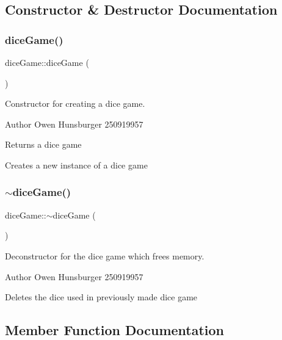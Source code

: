 \subsection{Constructor \& Destructor Documentation}
\mbox{\label{classdiceGame_ae964394c63494b6ceb6403e7a66aa4b2}} 
\subsubsection{\texorpdfstring{dice\+Game()}{diceGame()}}
{\footnotesize\ttfamily dice\+Game\+::dice\+Game (\begin{DoxyParamCaption}{ }\end{DoxyParamCaption})}



Constructor for creating a dice game. 

\begin{DoxyAuthor}{Author}
Owen Hunsburger 250919957 
\end{DoxyAuthor}
\begin{DoxyReturn}{Returns}
a dice game
\end{DoxyReturn}
Creates a new instance of a dice game \mbox{\label{classdiceGame_a33c18d6e62bb7599befc405ecbb21402}} 
\subsubsection{\texorpdfstring{$\sim$dice\+Game()}{~diceGame()}}
{\footnotesize\ttfamily dice\+Game\+::$\sim$dice\+Game (\begin{DoxyParamCaption}{ }\end{DoxyParamCaption})}



Deconstructor for the dice game which frees memory. 

\begin{DoxyAuthor}{Author}
Owen Hunsburger 250919957
\end{DoxyAuthor}
Deletes the dice used in previously made dice game 

\subsection{Member Function Documentation}
\mbox{\label{classdiceGame_a0620d98347df4779fa620b3b3e239d4e}} 
